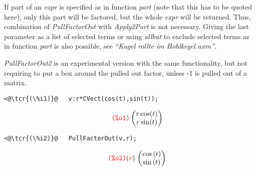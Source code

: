 \documentclass[../Maxima_Workbook.tex]{subfiles}
\begin{document}
\lz If part of an \emph{expr} is specified as in function \emph{part} (note that this has to be quoted here), only this part will be factored, but the whole \emph{expr} will be returned. Thus, combination of \emph{PullFactorOut} with \emph{Apply2Part} is not necessary. Giving the last parameter as a list of selected terms or using \emph{allbut} to exclude selected terms as in function \emph{part} is also possible, see \emph{"`Kugel rollte im Hohlkegel.wxm"'}.

\lz \emph{PullFactorOut2} is an experimental version with the same functionality, but not requiring to put a box around the pulled out factor, unless -1 is pulled out of a matrix. 

\lz \begin{small}
\color{blue} \leqn
\begin{lstlisting}
<@\tcr{(\%i1)}@   v:r*CVect(cos(t),sin(t));
\end{lstlisting}
\vspace{-5mm} \[\tag*{\tcr{\ttfamily (\%o1)}} \begin{pmatrix}
r \cos(t) \\ r \sin(t)
\end{pmatrix} \]
\vspace{-6mm} 
\begin{lstlisting}
<@\tcr{(\%i2)}@   PullFactorOut(v,r);
\end{lstlisting}
\vspace{-5mm} \[\tag*{\tcr{\ttfamily (\%o2)}} (\tcr{r})\, \begin{pmatrix}\cos{(t)}\\
\sin{(t)}\end{pmatrix} \]
\vspace{-2mm} 
\color{black} \reqn
\end{small}
\end{document}
